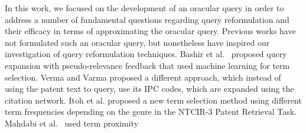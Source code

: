 



In this work, we focused on the development of an oracular query in
order to address a number of fundamental questions regarding query reformulation
and their efficacy in terms of approximating the oracular query.
Previous works have not formulated such an oracular query, but nonetheless
have inspired our investigation of query reformulation techniques.
Bashir et al.~\cite{Bashir2010} proposed query expansion with pseudo-relevance
feedback that used machine learning for term selection.
Verma and Varma
\cite{Verma2011} proposed a different approach, which instead of using
the patent text to query, use its IPC codes, which are expanded using the citation network.
Itoh et al. \cite{Itoh2003} proposed a new term selection method using different term
frequencies depending on the genre in the NTCIR-3 Patent Retrieval Task.
Mahdabi et al.~\cite{Mahdabi2013} used term proximity
